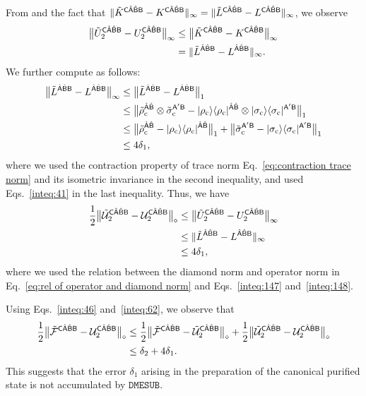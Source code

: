 From  and the fact that $\|\tilde{K}^{{\mathsf{C}}\hat{{\mathsf{A}}}\hat{{\mathsf{B}}}{\mathsf{B}}} - K^{{\mathsf{C}}\hat{{\mathsf{A}}}\hat{{\mathsf{B}}}{\mathsf{B}}}\|_\infty = \|\tilde{L}^{{\mathsf{C}}\hat{{\mathsf{A}}}\hat{{\mathsf{B}}}{\mathsf{B}}} - L^{{\mathsf{C}}\hat{{\mathsf{A}}}\hat{{\mathsf{B}}}{\mathsf{B}}}\|_\infty$, we observe
\begin{align}
    \big\|\tilde{U}_2^{{\mathsf{C}}\hat{{\mathsf{A}}}\hat{{\mathsf{B}}}{\mathsf{B}}} - U_2^{{\mathsf{C}}\hat{{\mathsf{A}}}\hat{{\mathsf{B}}}{\mathsf{B}}}\big\|_\infty
    &\leq \big\|\tilde{K}^{{\mathsf{C}}\hat{{\mathsf{A}}}\hat{{\mathsf{B}}}{\mathsf{B}}} - K^{{\mathsf{C}}\hat{{\mathsf{A}}}\hat{{\mathsf{B}}}{\mathsf{B}}}\big\|_\infty \\
    \label{inteq:147}
    &= \|\tilde{L}^{\hat{{\mathsf{A}}}\hat{{\mathsf{B}}}{\mathsf{B}}} - L^{\hat{{\mathsf{A}}}\hat{{\mathsf{B}}}{\mathsf{B}}}\|_\infty.
\end{align}
We further compute as follows:
\begin{align}
    \big\|\tilde{L}^{\hat{{\mathsf{A}}}\hat{{\mathsf{B}}}{\mathsf{B}}} -L^{\hat{{\mathsf{A}}}\hat{{\mathsf{B}}}{\mathsf{B}}}\big\|_\infty 
    &\leq \big\|\tilde{L}^{\hat{{\mathsf{A}}}\hat{{\mathsf{B}}}{\mathsf{B}}} - L^{\hat{{\mathsf{A}}}\hat{{\mathsf{B}}}{\mathsf{B}}}\big\|_1 \\
    &\leq \big\|\tilde{\rho}_{\rm c}^{\hat{{\mathsf{A}}}\hat{{\mathsf{B}}}} \otimes \tilde{\sigma}_{\rm c}^{{\mathsf{A}}'{\mathsf{B}}} - |\rho_{\rm c}\rangle\langle\rho_{\rm c}|^{\hat{{\mathsf{A}}}\hat{{\mathsf{B}}}} \otimes |\sigma_{\rm c}\rangle\langle\sigma_{\rm c}|^{{\mathsf{A}}'{\mathsf{B}}}\big\|_1 \\
    &\leq \big\|\tilde{\rho}_{\rm c}^{\hat{{\mathsf{A}}}\hat{{\mathsf{B}}}} - |\rho_{\rm c}\rangle\langle\rho_{\rm c}|^{\hat{{\mathsf{A}}}\hat{{\mathsf{B}}}}\big\|_1 + \big\|\tilde{\sigma}_{\rm c}^{{\mathsf{A}}'{\mathsf{B}}} - |\sigma_{\rm c}\rangle\langle\sigma_{\rm c}|^{{\mathsf{A}}'{\mathsf{B}}}\big\|_1 \\
    \label{inteq:148}
    &\leq 4\delta_1,
\end{align}
where we used the contraction property of trace norm Eq.~\eqref{eq:contraction trace norm} and its isometric invariance in the second inequality, and used Eqs.~\eqref{inteq:41} in the last inequality.
Thus, we have 
\begin{align}
    \frac{1}{2}\big\|\tilde{{\mathcal{U}}}_2^{{\mathsf{C}}\hat{{\mathsf{A}}}\hat{{\mathsf{B}}}{\mathsf{B}}} - {\mathcal{U}}_2^{{\mathsf{C}}\hat{{\mathsf{A}}}\hat{{\mathsf{B}}}{\mathsf{B}}}\big\|_\diamond
    &\leq \big\|\tilde{U}_2^{{\mathsf{C}}\hat{{\mathsf{A}}}\hat{{\mathsf{B}}}{\mathsf{B}}} - U_2^{{\mathsf{C}}\hat{{\mathsf{A}}}\hat{{\mathsf{B}}}{\mathsf{B}}}\big\|_\infty \\
    &\leq\|\tilde{L}^{\hat{{\mathsf{A}}}\hat{{\mathsf{B}}}{\mathsf{B}}} - L^{\hat{{\mathsf{A}}}\hat{{\mathsf{B}}}{\mathsf{B}}}\|_\infty \\
    \label{inteq:62}
    &\leq 4\delta_1,
\end{align}
where we used the relation between the diamond norm and operator norm in Eq.~\eqref{eq:rel of operator and diamond norm} and Eqs.~\eqref{inteq:147} and~\eqref{inteq:148}.


Using Eqs.~\eqref{inteq:46} and~\eqref{inteq:62}, we observe that
\begin{align}
\label{inteq:98}
    \frac{1}{2}\big\|\tilde{{\mathcal{F}}}^{{\mathsf{C}}\hat{{\mathsf{A}}}\hat{{\mathsf{B}}}{\mathsf{B}}} - {\mathcal{U}}_2^{{\mathsf{C}}\hat{{\mathsf{A}}}\hat{{\mathsf{B}}}{\mathsf{B}}}\big\|_\diamond
    &\leq \frac{1}{2}\big\|\tilde{{\mathcal{F}}}^{{\mathsf{C}}\hat{{\mathsf{A}}}\hat{{\mathsf{B}}}{\mathsf{B}}} - \tilde{{\mathcal{U}}}_2^{{\mathsf{C}}\hat{{\mathsf{A}}}\hat{{\mathsf{B}}}{\mathsf{B}}}\big\|_\diamond 
    + \frac{1}{2}\big\|\tilde{{\mathcal{U}}}_2^{{\mathsf{C}}\hat{{\mathsf{A}}}\hat{{\mathsf{B}}}{\mathsf{B}}} - {\mathcal{U}}_2^{{\mathsf{C}}\hat{{\mathsf{A}}}\hat{{\mathsf{B}}}{\mathsf{B}}}\big\|_\diamond \\
    \label{inteq:79}
    &\leq \delta_2 + 4\delta_1.
\end{align}
This suggests that the error $\delta_1$ arising in the preparation of the canonical purified state is not accumulated by $\mathtt{DMESUB}$.

